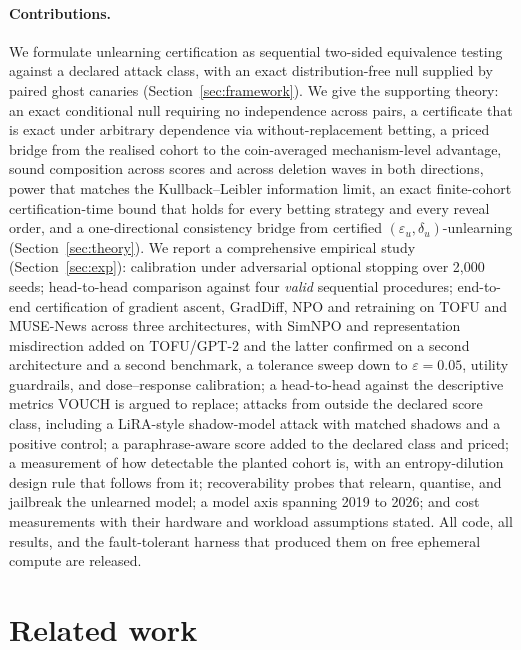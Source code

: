 \documentclass[pdflatex,sn-mathphys-num]{sn-jnl}
\theoremstyle{thmstyleone}
\theoremstyle{thmstyletwo}
\theoremstyle{thmstylethree}
\newcommand{\eps}{\varepsilon}
\begin{document}
\paragraph{Contributions.} We formulate unlearning certification as sequential
two-sided equivalence testing against a declared attack class, with an exact
distribution-free null supplied by paired ghost canaries
(Section~\ref{sec:framework}). We give the supporting theory: an exact conditional null
requiring no independence across pairs, a certificate that is exact under arbitrary
dependence via without-replacement betting, a priced bridge from the realised cohort to the coin-averaged
mechanism-level advantage, sound composition across scores and across deletion waves in both
directions, power that matches the Kullback--Leibler information limit, an exact
finite-cohort certification-time bound that holds for every betting strategy and every
reveal order, and a one-directional consistency bridge from certified
$(\eps_u,\delta_u)$-unlearning (Section~\ref{sec:theory}). We report a comprehensive empirical study
(Section~\ref{sec:exp}): calibration under adversarial optional stopping over 2{,}000
seeds; head-to-head comparison against four \emph{valid} sequential procedures;
end-to-end certification of gradient ascent, GradDiff, NPO and retraining on TOFU and
MUSE-News across three architectures, with SimNPO and representation misdirection
added on TOFU/GPT-2 and the latter confirmed on a second architecture and a second
benchmark, a tolerance sweep down to $\eps = 0.05$, utility guardrails, and
dose--response calibration; a head-to-head
against the descriptive metrics VOUCH is argued to replace; attacks from outside the
declared score class, including a LiRA-style shadow-model attack with matched shadows
and a positive control; a paraphrase-aware score added to the declared class and
priced; a measurement of how detectable the planted cohort is, with an
entropy-dilution design rule that follows from it; recoverability probes that relearn,
quantise, and jailbreak the unlearned model; a model axis spanning 2019 to 2026; and
cost measurements with their hardware and workload assumptions stated. All code, all
results, and the fault-tolerant harness that produced them on free ephemeral compute
are released.

\section{Related work}\label{sec:related}

\end{document}
